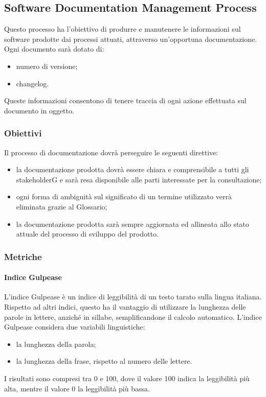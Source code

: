 			
			

	
	\subsection{Software Documentation Management Process}
	Questo processo ha l'obiettivo di produrre e manutenere le informazioni sul software prodotte dai processi
	attuati, attraverso un'opportuna documentazione.
	Ogni documento sarà dotato di:
		\begin{itemize}
			\item numero di versione;
			\item changelog.
		\end{itemize}
	Queste informazioni consentono di tenere traccia di ogni azione effettuata sul documento in oggetto.
		
		\subsubsection{Obiettivi}
		Il processo di documentazione dovrà perseguire le seguenti direttive:
			\begin{itemize}
				\item la documentazione prodotta dovrà essere chiara e comprensibile a tutti gli stakeholderG e
				sarà resa disponibile alle parti interessate per la consultazione;
				\item ogni forma di ambiguità sul significato di un termine utilizzato verrà eliminata grazie al
				Glossario;
				\item la documentazione prodotta sarà sempre aggiornata ed allineata allo stato attuale del
				processo di sviluppo del prodotto.
			\end{itemize}
		
		\subsubsection{Metriche}
			\paragraph{Indice Gulpease}
			L'indice Gulpease è un indice di leggibilità di un testo tarato sulla lingua italiana.
			Rispetto ad altri indici, questo ha il vantaggio di utilizzare la lunghezza delle parole in lettere, anziché in sillabe, semplificandone il calcolo automatico. L'indice Gulpease considera due variabili linguistiche:
			\begin{itemize}
				\item la lunghezza della parola;
				\item la lunghezza della frase, rispetto al numero delle lettere.
			\end{itemize}
			I risultati sono compresi tra 0 e 100, dove il valore 100 indica la leggibilità più alta, mentre il valore 0 la leggibilità più bassa.
			
